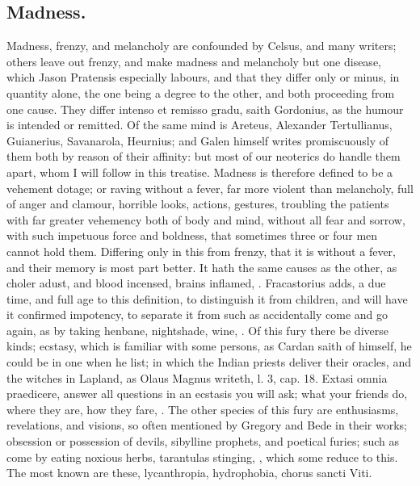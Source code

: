 {\subsection{Madness.}
Madness, frenzy, and melancholy are confounded by Celsus,
and many writers; others leave out frenzy, and make madness and
melancholy but one disease, which Jason Pratensis especially
labours, and that they differ only  or minus, in quantity
alone, the one being a degree to the other, and both proceeding from
one cause. They differ intenso et remisso gradu, saith Gordonius,
as the humour is intended or remitted. Of the same mind is
Areteus, Alexander Tertullianus, Guianerius, Savanarola, Heurnius;
and Galen himself writes promiscuously of them both by reason of their
affinity: but most of our neoterics do handle them apart, whom I will
follow in this treatise. Madness is therefore defined to be a vehement
dotage; or raving without a fever, far more violent than melancholy,
full of anger and clamour, horrible looks, actions, gestures, troubling
the patients with far greater vehemency both of body and mind, without
all fear and sorrow, with such impetuous force and boldness, that
sometimes three or four men cannot hold them. Differing only in this
from frenzy, that it is without a fever, and their memory is most part
better. It hath the same causes as the other, as choler adust, and
blood incensed, brains inflamed, \etc{}. Fracastorius adds, a due
time, and full age to this definition, to distinguish it from children,
and will have it confirmed impotency, to separate it from such as
accidentally come and go again, as by taking henbane, nightshade, wine,
\etc{}. Of this fury there be diverse kinds; ecstasy, which is familiar
with some persons, as Cardan saith of himself, he could be in one when
he list; in which the Indian priests deliver their oracles, and the
witches in Lapland, as Olaus Magnus writeth, l. 3, cap. 18. Extasi
omnia praedicere, answer all questions in an ecstasis you will ask;
what your friends do, where they are, how they fare, \etc{}. The other
species of this fury are enthusiasms, revelations, and visions, so
often mentioned by Gregory and Bede in their works; obsession or
possession of devils, sibylline prophets, and poetical furies; such as
come by eating noxious herbs, tarantulas stinging, \etc{}, which some
reduce to this. The most known are these, lycanthropia, hydrophobia,
chorus sancti Viti.

}
